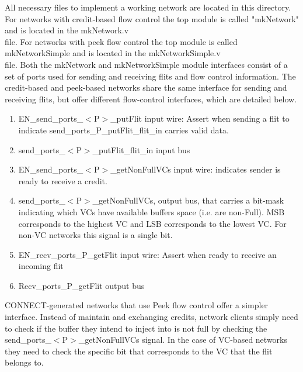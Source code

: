 \begin{appendix}
All necessary files to implement a working network are located in this directory.  For networks with credit-based flow control the top module is called "mkNetwork" and is located in the mkNetwork.v \\ file. For networks with peek flow control the top module is called mkNetworkSimple and is located in the mkNetworkSimple.v \\ file. Both the mkNetwork and mkNetworkSimple module interfaces consist of a set of ports used for sending and receiving flits and flow control information.  The credit-based and peek-based networks share the same interface for sending and receiving flits, but offer different flow-control interfaces, which are detailed below. 

\begin{enumerate}
\item{EN\_send\_ports\_$<$P$>$\_putFlit input wire: Assert when sending a flit to indicate send\_ports\_P\_putFlit\_flit\_in carries valid data.}
\item{send\_ports\_$<$P$>$\_putFlit\_flit\_in input bus}
\item{EN\_send\_ports\_$<$P$>$\_getNonFullVCs input wire: indicates sender is ready to receive a credit.}
\item{send\_ports\_$<$P$>$\_getNonFullVCs, output bus, that carries a bit-mask indicating which VCs have available buffers space (i.e. are non-Full). MSB corresponds to the highest VC and LSB corresponds to the lowest VC. For non-VC networks this signal is a single bit.}
\item{EN\_recv\_ports\_P\_getFlit input wire: Assert when ready to receive an incoming flit}
\item{Recv\_ports\_P\_getFlit output bus}
\end{enumerate}

CONNECT-generated networks that use Peek flow control offer a simpler interface. Instead of maintain and exchanging credits, network clients simply need to check if the buffer they intend to inject into is not full by checking the send\_ports\_$<$P$>$\_getNonFullVCs signal. In the case of VC-based networks they need to check the specific bit that corresponds to the VC that the flit belongs to.\\


\end{appendix}
